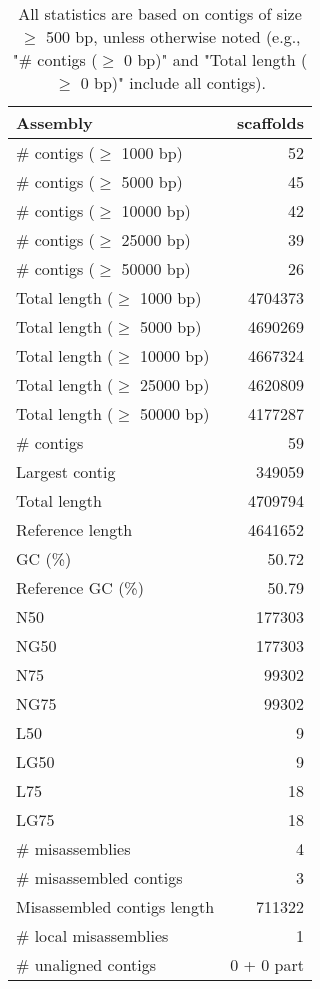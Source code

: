 \documentclass[12pt,a4paper]{article}
\begin{document}
\begin{table}[ht]
\begin{center}
\caption{All statistics are based on contigs of size $\geq$ 500 bp, unless otherwise noted (e.g., "\# contigs ($\geq$ 0 bp)" and "Total length ($\geq$ 0 bp)" include all contigs).}
\begin{tabular}{|l*{1}{|r}|}
\hline
Assembly & scaffolds \\ \hline
\# contigs ($\geq$ 1000 bp) & 52 \\ \hline
\# contigs ($\geq$ 5000 bp) & 45 \\ \hline
\# contigs ($\geq$ 10000 bp) & 42 \\ \hline
\# contigs ($\geq$ 25000 bp) & 39 \\ \hline
\# contigs ($\geq$ 50000 bp) & 26 \\ \hline
Total length ($\geq$ 1000 bp) & 4704373 \\ \hline
Total length ($\geq$ 5000 bp) & 4690269 \\ \hline
Total length ($\geq$ 10000 bp) & 4667324 \\ \hline
Total length ($\geq$ 25000 bp) & 4620809 \\ \hline
Total length ($\geq$ 50000 bp) & 4177287 \\ \hline
\# contigs & 59 \\ \hline
Largest contig & 349059 \\ \hline
Total length & 4709794 \\ \hline
Reference length & 4641652 \\ \hline
GC (\%) & 50.72 \\ \hline
Reference GC (\%) & 50.79 \\ \hline
N50 & 177303 \\ \hline
NG50 & 177303 \\ \hline
N75 & 99302 \\ \hline
NG75 & 99302 \\ \hline
L50 & 9 \\ \hline
LG50 & 9 \\ \hline
L75 & 18 \\ \hline
LG75 & 18 \\ \hline
\# misassemblies & 4 \\ \hline
\# misassembled contigs & 3 \\ \hline
Misassembled contigs length & 711322 \\ \hline
\# local misassemblies & 1 \\ \hline
\# unaligned contigs & 0 + 0 part \\ \hline

\end{tabular}
\end{center}
\end{table}
\end{document}
